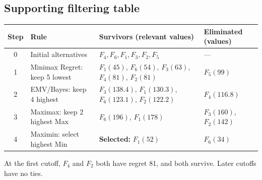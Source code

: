 \subsection*{Supporting filtering table}
\begin{center}\small
\begin{tabularx}{\textwidth}{@{}c >{\raggedright\arraybackslash}p{} >{\raggedright\arraybackslash}X >{\raggedright\arraybackslash}p{}@{}}
\toprule
Step & Rule & Survivors (relevant values) & Eliminated (values)\\\midrule
0 & Initial alternatives & $F_4,F_6,F_1,F_3,F_2,F_5$ & ---\\
1 & Minimax Regret: keep 5 lowest & $F_1(45)$, $F_6(54)$, $F_3(63)$, $F_4(81)$, $F_2(81)$ & $F_5(99)$\\
2 & EMV/Bayes: keep 4 highest & $F_3(138.4)$, $F_1(130.3)$, $F_6(123.1)$, $F_2(122.2)$ & $F_4(116.8)$\\
3 & Maximax: keep 2 highest Max & $F_6(196)$, $F_1(178)$ & $F_3(160)$, $F_2(142)$\\
4 & Maximin: select highest Min & \textbf{Selected:} $F_1(52)$ & $F_6(34)$\\
\bottomrule\end{tabularx}
\end{center}
At the first cutoff, $F_4$ and $F_2$ both have regret 81, and both survive. Later cutoffs have no ties.
\secInicio[sec:q4]

\label{sol:q4tree}
